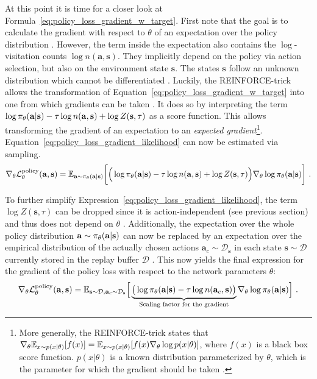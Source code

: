 At this point it is time for a closer look at Formula~\ref{eq:policy_loss_gradient_w_target}. First note that the goal is to calculate the gradient with respect to $\theta$ of an expectation over the policy distribution \p. However, the term inside the expectation also contains the $\log$-visitation counts $\log n(\mathbf a, \mathbf s)$. They implicitly depend on the policy via action selection, but also on the environment state $\mathbf s$. The states $\mathbf s$ follow an unknown distribution which cannot be differentiated \cite{suttonReinforcementLearningIntroduction2018}. Luckily, the REINFORCE-trick allows the transformation of Equation~\ref{eq:policy_loss_gradient_w_target} into one from which gradients can be taken \cite{williamsSimpleStatisticalGradientfollowing, moerlandA0CAlphaZero2018}. It does so by interpreting the term $\log \p - \tau \log n(\mathbf a, \mathbf s) + \log Z(\mathbf s, \tau)$ as a score function. This allows transforming the gradient of an expectation to an \emph{expected gradient}\footnote{More generally, the REINFORCE-trick states that $\nabla_\theta \mathbb{E}_{x \sim p(x|\theta)} [f(x)] = \mathbb{E}_{x \sim p(x|\theta)} [f(x) \nabla_\theta \log p(x|\theta)]$, where $f(x)$ is a black box score function. $p(x|\theta)$ is a known distribution parameterized by $\theta$, which is the parameter for which the gradient should be taken \cite{williamsSimpleStatisticalGradientfollowing, moerlandA0CAlphaZero2018}.}. Equation~\ref{eq:policy_loss_gradient_likelihood} can now be estimated via sampling.
\begin{gather}\label{eq:policy_loss_gradient_likelihood} 
  \nabla_\theta \mathcal L^{\text{policy}}_\theta(\mathbf a, \mathbf s)  = \E{\mathbf a \sim \p} \bigg[ \Big(  \log \p - \tau \log n(\mathbf a, \mathbf s) + \log Z(\mathbf s, \tau) \Big) \nabla_\theta \log \p   \bigg]~.  
\end{gather}

To further simplify Expression~\ref{eq:policy_loss_gradient_likelihood}, the term $\log Z(\mathbf s, \tau)$ can be dropped since it is action-independent (see previous section) and thus does not depend on $\theta$ \cite{moerlandA0CAlphaZero2018}. Additionally, the expectation over the whole policy distribution $\mathbf a \sim \p$ can now be replaced by an expectation over the empirical distribution of the actually chosen actions $\mathbf a_c \sim \mathcal D_{\mathbf s}$ in each state $\mathbf s \sim \mathcal D$ currently stored in the replay buffer $\mathcal D$ \cite{moerlandA0CAlphaZero2018}. This now yields the final expression for the gradient of the policy loss with respect to the network parameters $\theta$:
\begin{gather}\label{eq:policy_loss_gradient_final}
\nabla_\theta \mathcal L^{\text{policy}}_\theta(\mathbf a, \mathbf s) = \E{\mathbf s \sim \mathcal D, \mathbf a_c \sim \mathcal D_{\mathbf s}} \Big[ \underbrace{\big( \log \p - \tau \log n(\mathbf a_c, \mathbf s) \big)}_\text{Scaling factor for the gradient} \nabla_\theta \log \p \Big]~.
\end{gather}

